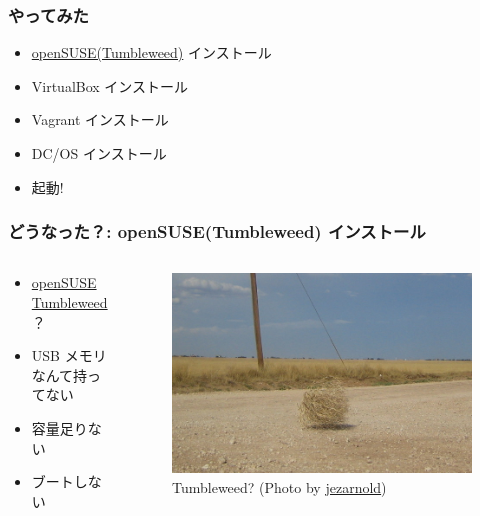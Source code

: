\documentclass[aspectratio=169,11pt,hyperref={colorlinks=true}]{beamer}
\begin{document}
\begin{frame}
  \frametitle{やってみた}
  \begin{itemize}
    \item \href{https://en.opensuse.org/Portal:Tumbleweed}{openSUSE(Tumbleweed)} インストール
    \item VirtualBox インストール
    \item Vagrant インストール
    \item DC/OS インストール
    \item 起動!
  \end{itemize}
\end{frame}

\begin{frame}
  \frametitle{どうなった？: openSUSE(Tumbleweed) インストール}
  \begin{columns}[T]
    \begin{column}{.45\textwidth}
      \begin{itemize}
        \item \href{https://www.opensuse.org/}{openSUSE} \href{https://www.opensuse.org/\#Tumbleweed}{Tumbleweed} ？
        \item USB メモリなんて持ってない
        \item 容量足りない
        \item ブートしない
      \end{itemize}
    \end{column}
    \begin{column}{0.28\textwidth}
      \begin{figure}
        \begin{center}
          \caption{Tumbleweed? (Photo by \href{https://www.flickr.com/photos/jezarnold/}{jezarnold})}
          \includegraphics[width=1.0\textwidth]{tumbleweed.jpg}

\end{center}
\end{figure}
\end{column}
\end{columns}
\end{frame}
\end{document}
